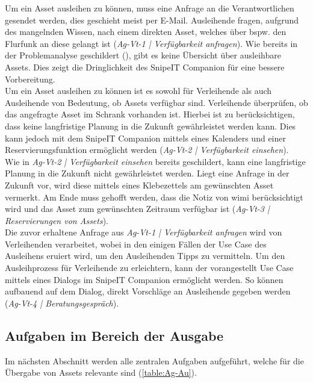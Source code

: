 Um ein Asset ausleihen zu können, muss eine Anfrage an die Verantwortlichen gesendet werden, dies
geschieht meist per E-Mail. Ausleihende fragen, aufgrund des mangelnden Wissen, nach einem direkten
Asset, welches über bspw. den Flurfunk an diese gelangt ist (\textit{Ag-Vt-1 | Verfügbarkeit
        anfragen}). Wie bereits in der Problemanalyse geschildert (),
gibt es keine Übersicht über ausleihbare Assets. Dies zeigt die Dringlichkeit des SnipeIT Companion
für eine bessere Vorbereitung.\\
Um ein Asset ausleihen zu können ist es sowohl für Verleihende als auch Ausleihende von Bedeutung,
ob Assets verfügbar sind. Verleihende überprüfen, ob das angefragte Asset im Schrank vorhanden ist.
Hierbei ist zu berücksichtigen, dass keine langfristige Planung in die Zukunft gewährleistet werden
kann. Dies kann jedoch mit dem SnipeIT Companion mittels eines Kalenders und einer
Reservierungsfunktion ermöglicht werden (\textit{Ag-Vt-2 | Verfügbarkeit einsehen}).\\
Wie in \textit{Ag-Vt-2 | Verfügbarkeit einsehen} bereits geschildert, kann eine langfristige Planung
in die Zukunft nicht gewährleistet werden. Liegt eine Anfrage in der Zukunft vor, wird diese mittels
eines Klebezettels am gewünschten Asset vermerkt. Am Ende muss gehofft werden, dass die Notiz von
\ac{wimi} berücksichtigt wird und das Asset zum gewünschten Zeitraum verfügbar ist (\textit{Ag-Vt-3
        | Reservierungen von Assets}). \\
Die zuvor erhaltene Anfrage aus \textit{Ag-Vt-1 | Verfügbarkeit anfragen} wird von Verleihenden
verarbeitet, wobei in den einigen Fällen der Use Case des Ausleihens eruiert wird, um den
Ausleihenden Tipps zu vermitteln. Um den Ausleihprozess für Verleihende zu erleichtern, kann der
vorangestellt Use Case mittels eines Dialogs im SnipeIT Companion ermöglicht werden. So können
aufbauend auf dem Dialog, direkt Vorschläge an Ausleihende gegeben werden (\textit{Ag-Vt-4 |
        Beratungsgespräch}).


\subsection{Aufgaben im Bereich der Ausgabe}
Im nächsten Abschnitt werden alle zentralen Aufgaben aufgeführt, welche für die Übergabe von
Assets relevante sind (\ref{table:Ag-Au}).

